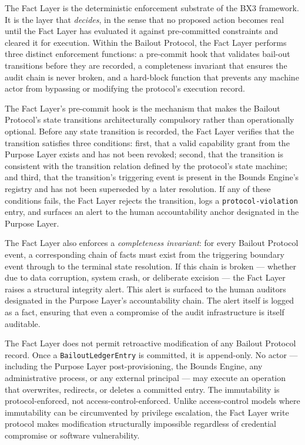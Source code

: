The Fact Layer is the deterministic enforcement substrate of the BX3 framework. It is the layer that \emph{decides}, in the sense that no proposed action becomes real until the Fact Layer has evaluated it against pre-committed constraints and cleared it for execution. Within the Bailout Protocol, the Fact Layer performs three distinct enforcement functions: a pre-commit hook that validates bail-out transitions before they are recorded, a completeness invariant that ensures the audit chain is never broken, and a hard-block function that prevents any machine actor from bypassing or modifying the protocol's execution record.

The Fact Layer's pre-commit hook is the mechanism that makes the Bailout Protocol's state transitions architecturally compulsory rather than operationally optional. Before any state transition is recorded, the Fact Layer verifies that the transition satisfies three conditions: first, that a valid capability grant from the Purpose Layer exists and has not been revoked; second, that the transition is consistent with the transition relation defined by the protocol's state machine; and third, that the transition's triggering event is present in the Bounds Engine's registry and has not been superseded by a later resolution. If any of these conditions fails, the Fact Layer rejects the transition, logs a \texttt{protocol-violation} entry, and surfaces an alert to the human accountability anchor designated in the Purpose Layer.

The Fact Layer also enforces a \emph{completeness invariant}: for every Bailout Protocol event, a corresponding chain of facts must exist from the triggering boundary event through to the terminal state resolution. If this chain is broken — whether due to data corruption, system crash, or deliberate excision — the Fact Layer raises a structural integrity alert. This alert is surfaced to the human auditors designated in the Purpose Layer's accountability chain. The alert itself is logged as a fact, ensuring that even a compromise of the audit infrastructure is itself auditable.

The Fact Layer does not permit retroactive modification of any Bailout Protocol record. Once a \texttt{BailoutLedgerEntry} is committed, it is append-only. No actor — including the Purpose Layer post-provisioning, the Bounds Engine, any administrative process, or any external principal — may execute an operation that overwrites, redirects, or deletes a committed entry. The immutability is protocol-enforced, not access-control-enforced. Unlike access-control models where immutability can be circumvented by privilege escalation, the Fact Layer write protocol makes modification structurally impossible regardless of credential compromise or software vulnerability.

